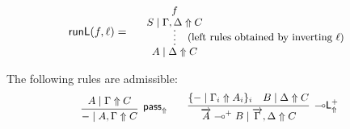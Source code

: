 \documentclass[runningheads]{llncs}
\renewcommand{\vec}{\overrightarrow}
\newcommand{\lleft}{{\multimap}\mathsf{L}}
\newcommand{\pass}{\mathsf{pass}}
\newcommand{\lolliL}{\lleft}
\newcommand{\lolli}{\multimap}
\newcommand{\proofbox}[1]{\begin{tabular}{l} #1 \end{tabular}}
\newcommand{\up}{\Uparrow}
\newcommand{\runL}{\mathsf{runL}}
\begin{document}
 \begin{equation}\label{eq:runL}
  \footnotesize
  \runL(f,\ell) = \quad
  \proofbox{
    \infer*[\;\; (\text{left rules obtained by inverting } \ell)]{A \mid \Delta \up C}{
      \deduce{S \mid \Gamma,\Delta \up C}{f}
    }
    }
 \end{equation}
\begin{proposition}\label{prop:lolliL}
  The following rules are admissible:
  \begin{equation}\label{eq:passlolliL}
  \small
  \begin{array}{c}
    \infer[\pass_\up]{- \mid A,\Gamma \up C}{
      A \mid \Gamma \up C}
    \qquad
    \infer[\lolliL^+_\up]{\vec{A} \lolli^+ B \mid \vec{\Gamma} , \Delta \up C}{
      \{ - \mid \Gamma_i \up A_i \}_{i}
      &
      B \mid \Delta \up C
    }
  \end{array}
  \end{equation}
\end{proposition}
\end{document}
